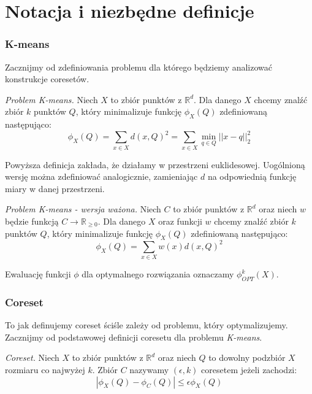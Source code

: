 \chapter{Notacja i niezbędne definicje}\label{preliminaries}
\subsection{K-means}

Zacznijmy od zdefiniowania problemu dla którego będziemy analizować konstrukcje coresetów.

\begin{definition}
    \emph{Problem K-means.} Niech $X$ to zbiór punktów z $\mathbb{R}^{d}$. 
    Dla danego $X$ chcemy znalźć zbiór $k$ punktów $Q$, który minimalizuje funkcję $\phi_{X}(Q)$ zdefiniowaną następująco:
    \begin{equation}
        \phi_{X}(Q) = \sum_{x \in X} d(x, Q)^{2} = \sum_{x \in X} \min_{q \in Q} || x - q ||_{2}^{2} 
    \end{equation}
\end{definition}

\noindent
Powyższa definicja zakłada, że działamy w przestrzeni euklidesowej.
Uogólnioną wersję można zdefiniować analogicznie, zamieniając $d$ na odpowiednią funkcję miary w danej przestrzeni.

\begin{definition}
    \emph{Problem K-means - wersja ważona.} Niech $C$ to zbiór punktów z $\mathbb{R}^{d}$ oraz niech $w$ będzie funkcją $C \rightarrow \mathbb{R}_{\ge0}$. 
    Dla danego $X$ oraz funkcji $w$ chcemy znalźć zbiór $k$ punktów $Q$, który minimalizuje funkcję $\phi_{X}(Q)$ zdefiniowaną następująco:
    \begin{equation}
        \phi_{X}(Q) = \sum_{x \in X} w(x) d(x, Q)^{2}
    \end{equation}
\end{definition}

\noindent
Ewaluację funkcji $\phi$ dla optymalnego rozwiązania oznaczamy $\phi_{OPT}^{k}(X)$. 

\subsection{Coreset}

To jak definujemy coreset ściśle zależy od problemu, który optymalizujemy.
Zacznijmy od podstawowej definicji coresetu dla problemu \textit{K-means}.

\begin{definition}
    \emph{Coreset.} Niech $X$ to zbiór punktów z $\mathbb{R}^{d}$ oraz niech $Q$ to dowolny podzbiór $X$ rozmiaru co najwyżej $k$. 
    Zbiór $C$ nazywamy $(\epsilon, k)$ coresetem jeżeli zachodzi:
    \begin{equation}
        |\phi_{X}(Q) - \phi_{C}(Q)| \leq \epsilon\phi_{X}(Q)
    \end{equation}
\end{definition}

